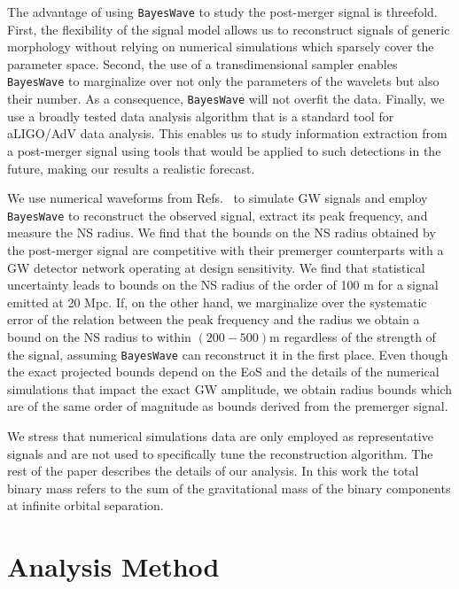 \documentclass[aps,prd,amsmath,floats,floatfix, twocolumn,
superscriptaddress,nofootinbib,showpacs]{revtex4-1}
\begin{document}
The advantage of using {\tt BayesWave} to study the post-merger signal is threefold. First, the flexibility of the signal model allows us to reconstruct signals of generic morphology without relying on numerical simulations which sparsely cover the parameter space. Second, the use of a transdimensional sampler enables {\tt BayesWave} to marginalize over not only the parameters of the wavelets but also their number. As a consequence, {\tt BayesWave} will not overfit the data. Finally, we use a broadly tested data analysis algorithm that is a standard tool for aLIGO/AdV data analysis. This enables us to study information extraction from a post-merger signal using tools that would be applied to such detections in the future, making our results a realistic forecast.
 
We use numerical waveforms from Refs.~\cite{bauswein:12,bauswein:14,bauswein:15,bauswein:july15} to simulate GW signals and employ {\tt BayesWave} to reconstruct the observed signal, extract its peak frequency, and measure the NS radius. We find that the bounds on the NS radius obtained by the post-merger signal are competitive with their premerger counterparts with a GW detector network operating at design sensitivity. We find that statistical uncertainty leads to bounds on the NS radius of the order of 100 m for a signal emitted at 20 Mpc. If, on the other hand, we marginalize over the systematic error of the relation between the peak frequency and the radius we obtain a bound on the NS radius to within $(200-500)$m regardless of the strength of the signal, assuming {\tt BayesWave} can reconstruct it in the first place. Even though the exact projected bounds depend on the EoS and the details of the numerical simulations that impact the exact GW amplitude, we obtain radius bounds which are of the same order of magnitude as bounds derived from the premerger signal.

We stress that numerical simulations data are only employed as representative signals and are not used to specifically tune the reconstruction algorithm. The rest of the paper describes the details of our analysis. In this work the total binary mass refers to the sum of the gravitational mass of the binary components at infinite orbital separation.
 


\section{Analysis Method}
\label{sec:analysismethod}
\end{document}
